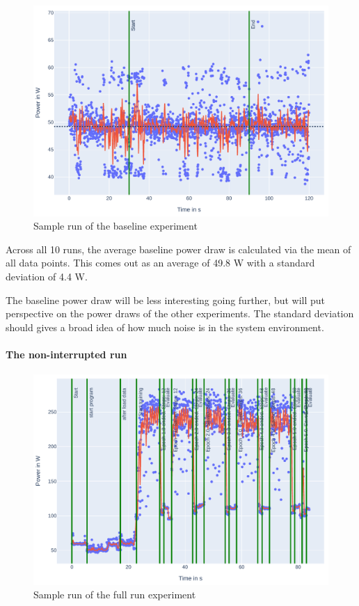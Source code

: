 \begin{figure}
    \includegraphics[width=\linewidth]{power-measurements/measurements_sleep_0714004033/plot.pdf}
    \caption{Sample run of the baseline experiment}
    \label{fig:plot_baseline}
\end{figure}

Across all 10 runs, the average baseline power draw is calculated via the mean of all data points. This comes out as an average of 49.8 W with a standard deviation of 4.4 W.

The baseline power draw will be less interesting going further, but will put perspective on the power draws of the other experiments. The standard deviation should gives a broad idea of how much noise is in the system environment.

\paragraph{The non-interrupted run}

\begin{figure}
    \includegraphics[width=\linewidth]{power-measurements/measurements_roberta_full_0714010405/plot.pdf}
    \caption{Sample run of the full run experiment}
    \label{fig:plot_full}
\end{figure}

